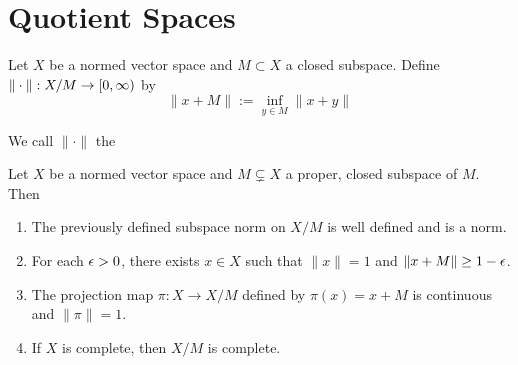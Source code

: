 \documentclass{book}
\begin{document}
	
	
	
	
	
	
	
	\newpage
	\section{Quotient Spaces}	
	
	\begin{defn} \ld{}
		Let $X$ be a normed vector space and $M \subset X$ a closed subspace. Define $\|\cdot\|:X/M \rightarrow [0,\infty)$ by $$\|x+M\| := \inf_{y \in M}\|x+y\|$$
		
		We call $\|\cdot\|$ the 
	\end{defn}
	
	\begin{ex} \lex{}
		Let $X$ be a normed vector space and $M \subsetneq X$ a proper, closed subspace of $M$. 
		Then 
		\begin{enumerate}
			\item The previously defined subspace norm on $X/M$ is well defined and is a norm. 
			\item For each $\epsilon > 0$, there exists $x \in X$ such that $\|x\|=1$ and $\|x+M\| \geq 1-\epsilon$.
			\item The projection map $\pi:X \rightarrow X/M$ defined by $\pi(x) = x+M$ is continuous and $\|\pi\|=1$. 
			\item If $X$ is complete, then $X/M$ is complete. 
		\end{enumerate} 
	\end{ex}
	
\end{document}
